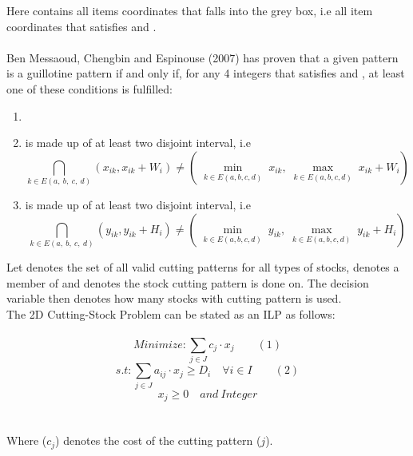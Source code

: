 \documentclass[a4paper]{article}
\begin{document}
    \noindent Here  contains all items coordinates that falls into the grey box, i.e all item coordinates that satisfies  and .
    \\ \\
    Ben Messaoud, Chengbin and Espinouse (2007) \cite{BENMESSAOUD2008112} has proven that a given pattern is a guillotine pattern if and only if, for any 4 integers  that satisfies  and , at least one of these conditions is fulfilled:
    \begin{enumerate}
        \item {} 
        \item {} is made up of at least two disjoint interval, i.e
        \[ \bigcap_{k \in E(a,\ b,\ c,\ d)} (x_{ik}, x_{ik} + W_i) \neq (\min_{\substack{k \in E(a, b, c, d)}} x_{ik}, \max_{\substack{k \in E(a, b, c, d)}} x_{ik} + W_i) \]
        \item {} is made up of at least two disjoint interval, i.e
        \[ \bigcap_{k \in E(a,\ b,\ c,\ d)} (y_{ik}, y_{ik} + H_i) \neq (\min_{\substack{k \in E(a, b, c, d)}} y_{ik}, \max_{\substack{k \in E(a, b, c, d)}} y_{ik} + H_i) \]
    \end{enumerate}
    \noindent
    Let  denotes the set of all valid cutting patterns for all types of stocks,
     denotes a member of  and  denotes the stock cutting pattern  is done on.
    The decision variable  then denotes how many stocks with cutting pattern  is used.
    \vspace{0.2cm}\\
    The 2D Cutting-Stock Problem can be stated as an ILP as follows:
    \\ \\
    \[ Minimize: \sum_{j \in J} c_j \cdot x_j \qquad (1)\]
    \[ s.t:  \sum_{j \in J} a_{ij} \cdot x_j \geqslant D_i \quad \forall i \in I \qquad (2)\]
    \[  x_j \geqslant 0 \quad and \  Integer \]
    \\ \\
    \noindent
    Where \boldmath($c_j$) denotes the cost of the cutting pattern \boldmath($j$).
\end{document}
